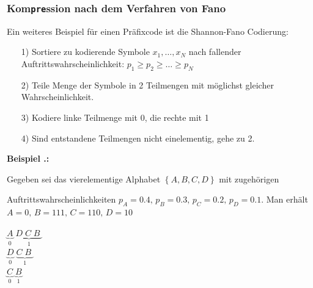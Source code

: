 \documentclass[a4paper,12pt]{article}
\newcounter{Beispiel}
\newenvironment{Beispiel}{
\medskip
        
        \setlength{\parindent}{0pt}
        \addtocounter{Beispiel}{1}
        \textbf{\textsf{Beispiel \thesubsection.\theBeispiel}:}\\}{
        \nopagebreak
        \vspace{-1.0ex}
        \bigskip
        
}
\begin{document}
\subsubsection{Kom{\tt{pre}}ssion nach dem Verfahren von Fano}
Ein weiteres Beispiel für einen Präfixcode ist die Shannon-Fano Codierung:
\begin{itemize}
\item[1)] Sortiere zu kodierende Symbole $x_{1},\ldots,x_{N}$ nach fallender Auftrittswahrscheinlichkeit: 
$p_{1}\geq p_{2}\geq\ldots\geq p_{N}$
\item[2)] Teile Menge der Symbole in 2 Teilmengen mit möglichst gleicher Wahrscheinlichkeit.
\item[3)] Kodiere linke Teilmenge mit 0, die rechte mit 1
\item[4)] Sind entstandene Teilmengen nicht einelementig, gehe zu 2.
\end{itemize}
\begin{Beispiel}
\begin{minipage}[h]{.8\textwidth}
Gegeben sei das vierelementige Alphabet $\left\{A, B, C, D\right\}$ mit zugehörigen
\par
 Auftrittswahrscheinlichkeiten
 $p_A =0.4,\, p_B = 0.3,\, p_C = 0.2,\, p_D =0.1$. Man erhält $A=0,\,B=111,\,C=110,\,D=10$
\\
\vspace{0.2cm}
\end{minipage}
\hfill
 \begin{minipage}[h]{.2\textwidth}
\begin{flushright}
$\underbrace{A}_{0} \;\underbrace{D\; C\; B\;}_{1}$
\\
\quad$\underbrace{D}_{0}\;\underbrace{C\; B\;}_{1}$
\\
\quad\quad$\underbrace{C}_{0}\;\underbrace{B}_{1}$
\end{flushright}
\end{minipage}    
\end{Beispiel}
\end{document}
